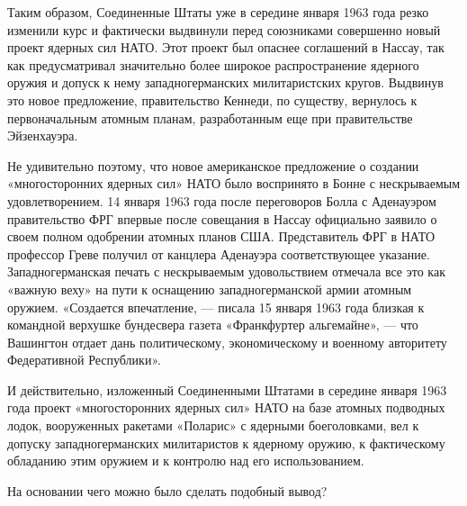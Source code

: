 \documentclass[12pt, a4paper, openany]{book}
\begin{document}
Таким образом, Соединенные Штаты уже в середине января 1963 года резко изменили курс и фактически выдвинули перед союзниками совершенно новый проект ядерных сил НАТО. Этот проект был опаснее соглашений в Нассау, так как предусматривал значительно более широкое распространение ядерного оружия и допуск к нему западногерманских милитаристских кругов. Выдвинув это новое предложение, правительство Кеннеди, по существу, вернулось к первоначальным атомным планам, разработанным еще при правительстве Эйзенхауэра.

Не удивительно поэтому, что новое американское предложение о создании «многосторонних ядерных сил» НАТО было воспринято в Бонне с нескрываемым удовлетворением. 14 января 1963 года после переговоров Болла с Аденауэром правительство ФРГ впервые после совещания в Нассау официально заявило о своем полном одобрении атомных планов США. Представитель ФРГ в НАТО профессор Греве получил от канцлера Аденауэра соответствующее указание. Западногерманская печать с нескрываемым удовольствием отмечала все это как «важную веху» на пути к оснащению западногерманской армии атомным оружием. «Создается впечатление, — писала 15 января 1963 года близкая к командной верхушке бундесвера газета «Франкфуртер альгемайне», — что Вашингтон отдает дань политическому, экономическому и военному авторитету Федеративной Республики».

И действительно, изложенный Соединенными Штатами в середине января 1963 года проект «многосторонних ядерных сил» НАТО на базе атомных подводных лодок, вооруженных ракетами «Поларис» с ядерными боеголовками, вел к допуску западногерманских милитаристов к ядерному оружию, к фактическому обладанию этим оружием и к контролю над его использованием.

На основании чего можно было сделать подобный вывод?
\end{document}
